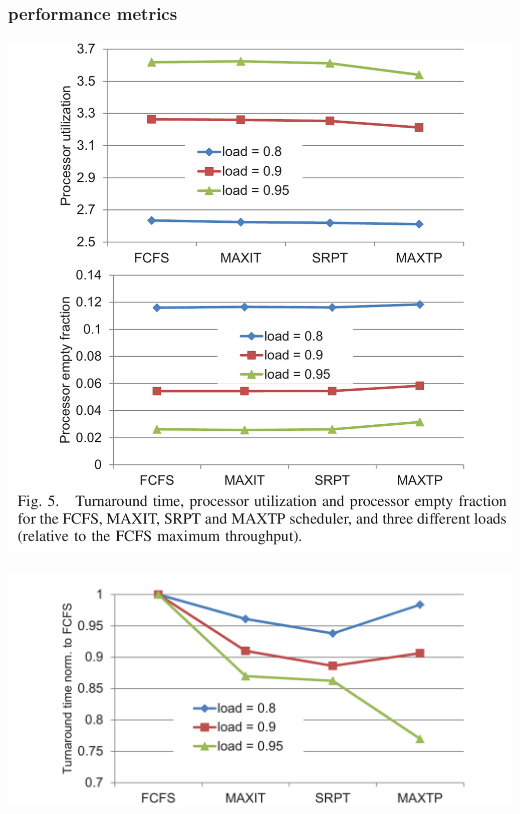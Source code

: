 \documentclass[utf8,10pt]{beamer}
\begin{document}
\begin{frame}
  \frametitle{performance metrics}
  \begin{minipage}[l]{.49\columnwidth}
    \centering
    \includegraphics[height=0.7\textheight,
    keepaspectratio]{./empty_utilization_comparison_bottom}
  \end{minipage}
  \begin{minipage}[r]{.49\columnwidth}
    \centering
    \includegraphics[width=\columnwidth,
    keepaspectratio]{./empty_utilization_comparison_top}
  \end{minipage}
\end{frame}
\end{document}
